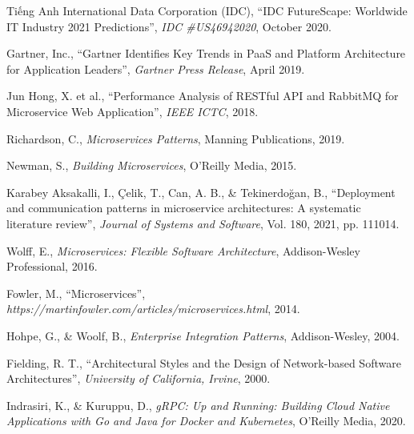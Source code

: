 \documentclass{uetgraduation}
\begin{document}
\begin{thebibliography}{9}

    \begin{bibsection}{Tiếng Anh}
        International Data Corporation (IDC),
        ``IDC FutureScape: Worldwide IT Industry 2021 Predictions'',
        \textit{IDC \#US46942020},
        October 2020.

        Gartner, Inc.,
        ``Gartner Identifies Key Trends in PaaS and Platform Architecture for Application Leaders'',
        \textit{Gartner Press Release},
        April 2019.

        Jun Hong, X. et al.,
        ``Performance Analysis of RESTful API and RabbitMQ for Microservice Web Application'',
        \textit{IEEE ICTC},
        2018.

        Richardson, C.,
        \textit{Microservices Patterns},
        Manning Publications, 2019.

        Newman, S.,
        \textit{Building Microservices},
        O'Reilly Media, 2015.

        Karabey Aksakalli, I., Çelik, T., Can, A. B., \& Tekinerdoğan, B.,
        ``Deployment and communication patterns in microservice architectures: A systematic literature review'',
        \textit{Journal of Systems and Software},
        Vol. 180, 2021, pp. 111014.

        Wolff, E.,
        \textit{Microservices: Flexible Software Architecture},
        Addison-Wesley Professional, 2016.

        Fowler, M.,
        ``Microservices'',
        \textit{https://martinfowler.com/articles/microservices.html},
        2014.

        Hohpe, G., \& Woolf, B.,
        \textit{Enterprise Integration Patterns},
        Addison-Wesley, 2004.

        Fielding, R. T.,
        ``Architectural Styles and the Design of Network-based Software Architectures'',
        \textit{University of California, Irvine},
        2000.

        Indrasiri, K., \& Kuruppu, D.,
        \textit{gRPC: Up and Running: Building Cloud Native Applications with Go and Java for Docker and Kubernetes},
        O'Reilly Media, 2020.


\end{bibsection}
\end{thebibliography}
\end{document}
